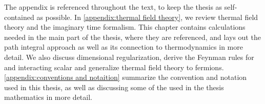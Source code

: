 The appendix is referenced throughout the text, to keep the thesis as self-contained as possible.
In \autoref{appendix:thermal field theory}, we review thermal field theory and the imaginary time formalism.
This chapter contains calculations needed in the main part of the thesis, where they are referenced, and lays out the path integral approach as well as its connection to thermodynamics in more detail.
We also discuss dimensional regularization, derive the Feynman rules for and interacting scalar and generalize thermal field theory to fermions.
\autoref{appendix:conventions and notaition} summarize the convention and notation used in this thesis, as well as discussing some of the used in the thesis mathematics in more detail.


